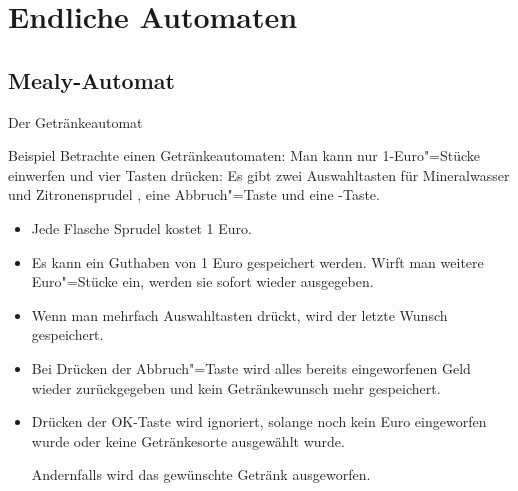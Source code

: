 
\section{Endliche Automaten}
\subsection{Mealy-Automat}




\begin{frame}{Der Getränkeautomat}

	\begin{exampleblock}{Beispiel} \small
		Betrachte einen Getränkeautomaten:
		Man kann nur 1-Euro"=Stücke einwerfen und vier Tasten drücken: Es gibt
		zwei Auswahltasten für Mineralwasser \tasteRein{} und Zitronensprudel
		\tasteZitro{}, eine Abbruch"=Taste \tasteC{} und eine \tasteOK-Taste.

	
	\begin{itemize}
	\item Jede Flasche Sprudel kostet 1 Euro.
	\item Es kann ein Guthaben von 1 Euro gespeichert werden. Wirft man
	  weitere Euro"=Stücke ein, werden sie sofort wieder ausgegeben.
	\item Wenn man mehrfach Auswahltasten drückt, wird der letzte Wunsch
	  gespeichert.
	\item Bei Drücken der Abbruch"=Taste wird alles bereits eingeworfenen
	  Geld wieder zurückgegeben und kein Getränkewunsch mehr gespeichert.
	\item Drücken der OK-Taste wird ignoriert, solange noch kein Euro
	  eingeworfen wurde oder keine Getränkesorte ausgewählt wurde.

	  Andernfalls wird das gewünschte Getränk ausgeworfen.
	\end{itemize} 
	\end{exampleblock}
\end{frame}

